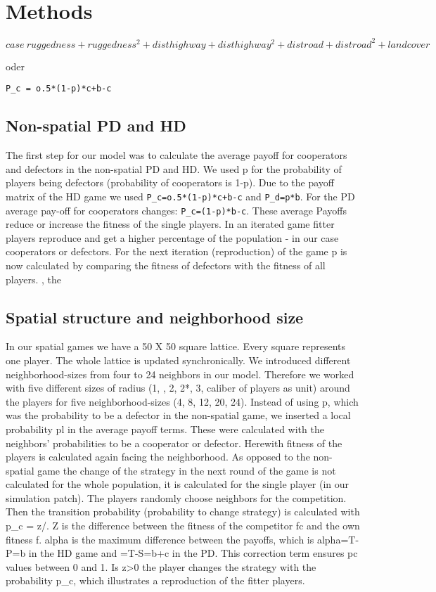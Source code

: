 \section{Methods}

\[
\displaystyle case ~ ruggedness + ruggedness^2 + disthighway + disthighway^2 + distroad + distroad^2 + landcover
\]

oder


\texttt{P_{c} = o.5*(1-p)*c+b-c}




\subsection{Non-spatial PD and HD}

The first step for our model was to calculate the average payoff for cooperators and defectors in the non-spatial PD and HD. We used p for the probability of players being defectors (probability of cooperators is 1-p). Due to the payoff matrix of the HD game we used \texttt{P_{c}=o.5*(1-p)*c+b-c} and \texttt{P_{d}=p*b}. For the PD average pay-off for cooperators changes: \texttt{P_{c}=(1-p)*b-c}. These average Payoffs reduce or increase the fitness of the single players. In an iterated game fitter players reproduce and get a higher percentage of the population - in our case cooperators or defectors. For the next iteration (reproduction) of the game p is now calculated by comparing the fitness of defectors with the fitness of all players.
, the 
\subsection{Spatial structure and neighborhood size}
In our spatial games we have a 50 X 50 square lattice. Every square represents one player. The whole lattice is updated synchronically. We introduced different neighborhood-sizes from four to 24 neighbors in our model. Therefore we worked with five different sizes of radius (1, , 2, 2*, 3, caliber of players as unit) around the players for five neighborhood-sizes (4, 8, 12, 20, 24). Instead of using p, which was the probability to be a defector in the non-spatial game, we inserted a local probability pl in the average payoff terms. These were calculated with the neighbors' probabilities to be a cooperator or defector. Herewith fitness of the players is calculated again facing the neighborhood. As opposed to the non-spatial game the change of the strategy in the next round of the game is not calculated for the whole population, it is calculated for the single player (in our simulation patch). The players randomly choose neighbors for the competition. Then the transition probability (probability to change strategy) is calculated with p_{c} = z/\alpha. Z is the difference between the fitness of the competitor fc and the own fitness f. alpha is the maximum difference between the payoffs, which is alpha=T-P=b in the HD game and \alpha=T-S=b+c in the PD. This correction term ensures pc values between 0 and 1. Is z>0 the player changes the strategy with the probability p_{c}, which illustrates a reproduction of the fitter players.

